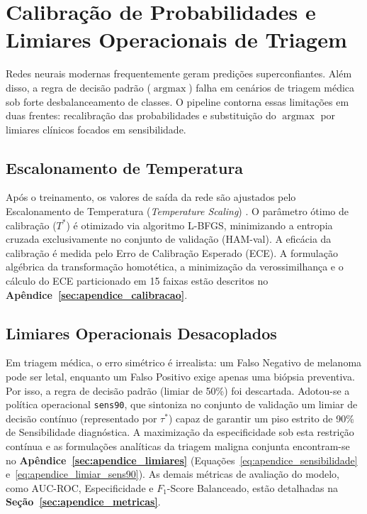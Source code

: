 \documentclass[oneside,english,brazilian]{UNISINOSmonografia}
\begin{document}
\section{Calibração de Probabilidades e Limiares Operacionais de Triagem}

Redes neurais modernas frequentemente geram predições superconfiantes. Além disso, a regra de decisão padrão ($\operatorname{argmax}$) falha em cenários de triagem médica sob forte desbalanceamento de classes. O pipeline contorna essas limitações em duas frentes: recalibração das probabilidades e substituição do $\operatorname{argmax}$ por limiares clínicos focados em sensibilidade.

\subsection{Escalonamento de Temperatura}
Após o treinamento, os valores de saída da rede são ajustados pelo Escalonamento de Temperatura (\textit{Temperature Scaling}) \cite{guo2017calibration}. O parâmetro ótimo de calibração ($T^*$) é otimizado via algoritmo L-BFGS, minimizando a entropia cruzada exclusivamente no conjunto de validação (HAM-val). A eficácia da calibração é medida pelo Erro de Calibração Esperado (ECE). A formulação algébrica da transformação homotética, a minimização da verossimilhança e o cálculo do ECE particionado em 15 faixas estão descritos no \textbf{Apêndice~\ref{sec:apendice_calibracao}}.

\subsection{Limiares Operacionais Desacoplados}
Em triagem médica, o erro simétrico é irrealista: um Falso Negativo de melanoma pode ser letal, enquanto um Falso Positivo exige apenas uma biópsia preventiva. Por isso, a regra de decisão padrão (limiar de 50\%) foi descartada. Adotou-se a política operacional \texttt{sens90}, que sintoniza no conjunto de validação um limiar de decisão contínuo (representado por $\tau^*$) capaz de garantir um piso estrito de 90\% de Sensibilidade diagnóstica. A maximização da especificidade sob esta restrição contínua e as formulações analíticas da triagem maligna conjunta encontram-se no \textbf{Apêndice~\ref{sec:apendice_limiares}} (Equações~\ref{eq:apendice_sensibilidade} e~\ref{eq:apendice_limiar_sens90}). As demais métricas de avaliação do modelo, como AUC-ROC, Especificidade e $F_1$-Score Balanceado, estão detalhadas na \textbf{Seção~\ref{sec:apendice_metricas}}.
\end{document}
